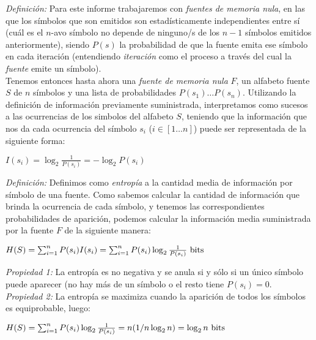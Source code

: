 \emph{Definición:} Para este informe trabajaremos con \emph{fuentes de memoria nula}, en las que los símbolos
que son emitidos son estadísticamente independientes entre sí (cuál es el $n$-avo símbolo no depende de ninguno/s de los $n-1$ símbolos emitidos anteriormente), siendo $P(s)$ la probabilidad de que la fuente emita ese símbolo en cada iteración (entendiendo
\emph{iteración} como el proceso a través del cual la \emph{fuente} emite un símbolo).\\

Tenemos entonces hasta ahora una \emph{fuente de memoria nula} $F$, un alfabeto fuente $S$ de $n$ símbolos y una lista
de probabilidades $P(s_1) \ldots P(s_n)$. Utilizando la definición de información previamente suministrada, interpretamos como 
sucesos a las ocurrencias de los simbolos del alfabeto $S$, teniendo que la información que nos da cada ocurrencia del símbolo
$s_i$ ($i\in[1\ldots n]$) puede ser representada de la siguiente forma:

\begin{center}
\begin{math}
I(s_i) = \log_2{\frac{1}{P(s_i)}} = -\log_2{P(s_i)}
\end{math}
\end{center}

\emph{Definición:} Definimos como \emph{entropía} a la cantidad media de información por símbolo de una fuente.
Como sabemos calcular la cantidad de información que brinda la ocurrencia de cada símbolo, y tenemos las correspondientes
probabilidades de aparición, podemos calcular la información media suministrada por la fuente $F$ de la siguiente manera:

\begin{center}
\begin{math}
H(S)= \sum_{i=1}^{n} P(s_i) I(s_i) = \sum_{i=1}^{n} P(s_i) \log_2{\frac{1}{P(s_i)}}$ bits$ 
\end{math}
\end{center}

\emph{Propiedad 1:} La entropía es no negativa y se anula si y sólo si un único símbolo puede aparecer (no hay más de un símbolo
o el resto tiene $P(s_i)=0$.\\

\emph{Propiedad 2:} La entropía se maximiza cuando la aparición de todos los símbolos es equiprobable, luego:

\begin{center}
\begin{math}
H(S)= \sum_{i=1}^{n} P(s_i) \log_2{\frac{1}{P(s_i)}} =  n (1/n \log_2{n}) = \log_2{n}$ bits$ 
\end{math}
\end{center}

